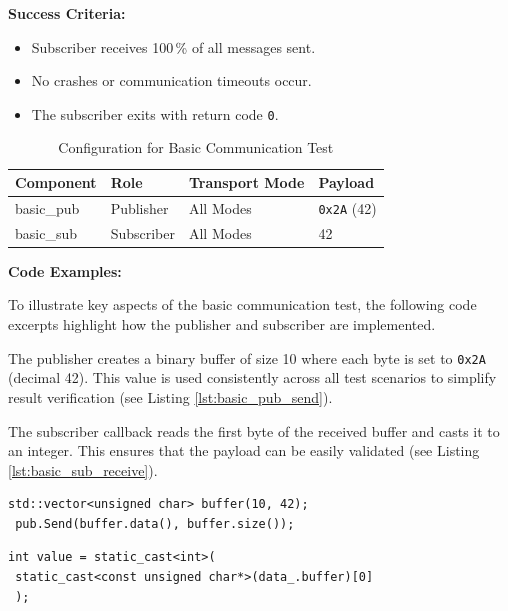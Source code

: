 \textbf{Success Criteria:}
\begin{itemize}
	\item Subscriber receives 100\,\% of all messages sent.
	\item No crashes or communication timeouts occur.
	\item The subscriber exits with return code \texttt{0}.
\end{itemize}

\begin{table}[H]
	\centering
	\begin{tabular}{@{}llll@{}}
		\toprule
		\textbf{Component} & \textbf{Role} & \textbf{Transport Mode} & \textbf{Payload} \\
		\midrule
		basic\_pub  & Publisher  & All Modes  & \texttt{0x2A} (42) \\
		basic\_sub  & Subscriber & All Modes  & 42 \\
		\bottomrule
	\end{tabular}
	\caption{Configuration for Basic Communication Test}
	\captionsetup{position=bottom}
	\label{tab:basic_comm_test}
\end{table}


\textbf{Code Examples:}

\vspace{0.4em}
To illustrate key aspects of the basic communication test, the following code excerpts highlight how the publisher and subscriber are implemented.

\vspace{1em}
The publisher creates a binary buffer of size 10 where each byte is set to \texttt{0x2A} (decimal 42). This value is used consistently across all test scenarios to simplify result verification (see Listing \ref{lst:basic_pub_send}).

\vspace{1em}
The subscriber callback reads the first byte of the received buffer and casts it to an integer. This ensures that the payload can be easily validated (see Listing \ref{lst:basic_sub_receive}).
\vspace{0.5em}

\begin{lstlisting}[style=cppstyle, caption={Binary buffer with value 42 used by the publisher}, label={lst:basic_pub_send}, captionpos=b]
 std::vector<unsigned char> buffer(10, 42);
 pub.Send(buffer.data(), buffer.size());
\end{lstlisting}

\begin{lstlisting}[style=cppstyle, caption={Extracting first byte from the received message in subscriber}, label={lst:basic_sub_receive}, captionpos=b]
 int value = static_cast<int>(
 static_cast<const unsigned char*>(data_.buffer)[0]
 );
\end{lstlisting}

